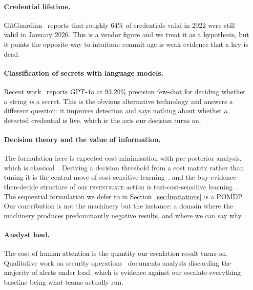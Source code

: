 \documentclass{article}
\begin{document}
\paragraph{Credential lifetime.}
GitGuardian~\cite{gitguardian2026} reports that roughly $64\%$ of credentials
valid in 2022 were still valid in January 2026. This is a vendor figure and we
treat it as a hypothesis, but it points the opposite way to intuition: commit
age is weak evidence that a key is dead.

\paragraph{Classification of secrets with language models.}
Recent work~\cite{rahman2025secretbreach} reports GPT-4o at $93.29\%$ precision
few-shot for deciding whether a string \emph{is} a secret. This is the obvious
alternative technology and answers a different question: it improves detection
and says nothing about whether a detected credential is live, which is the axis
our decision turns on.

\paragraph{Decision theory and the value of information.}
The formulation here is expected-cost minimisation with pre-posterior analysis,
which is classical~\cite{raiffa1961applied,howard1966voi}. Deriving a decision
threshold from a cost matrix rather than tuning it is the central move of
cost-sensitive learning~\cite{elkan2001foundations,domingos1999metacost}, and
the buy-evidence-then-decide structure of our \textsc{investigate} action is
test-cost-sensitive learning~\cite{turney2000types}. The sequential formulation
we defer to in Section~\ref{sec:limitations} is a
POMDP~\cite{smallwood1973optimal,kaelbling1998pomdp}. Our contribution is not
the machinery but the instance: a domain where the machinery produces
predominantly negative results, and where we can say why.

\paragraph{Analyst load.}
The cost of human attention is the quantity our escalation result turns on.
Qualitative work on security operations~\cite{alahmadi2022falsepositives}
documents analysts discarding the majority of alerts under load, which is
evidence against our escalate-everything baseline being what teams actually run.
\end{document}
